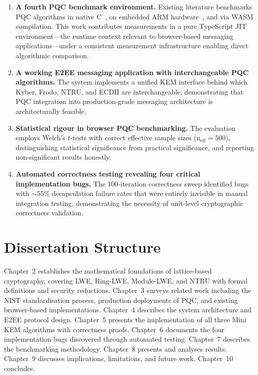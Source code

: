\documentclass[12pt,a4paper]{report}
\begin{document}
\begin{enumerate}
  \item \textbf{A fourth PQC benchmark environment.} Existing literature benchmarks
  PQC algorithms in native C~\cite{crystals_kyber_spec}, on embedded ARM
  hardware~\cite{pqm4}, and via WASM compilation. This work contributes measurements
  in a pure TypeScript JIT environment---the runtime context relevant to browser-based
  messaging applications---under a consistent measurement infrastructure enabling
  direct algorithmic comparison.

  \item \textbf{A working E2EE messaging application with interchangeable PQC
  algorithms.} The system implements a unified KEM interface behind which Kyber, Frodo,
  NTRU, and ECDH are interchangeable, demonstrating that PQC integration into
  production-grade messaging architecture is architecturally feasible.

  \item \textbf{Statistical rigour in browser PQC benchmarking.} The evaluation
  employs Welch's $t$-tests with correct effective sample sizes (n$_{\text{eff}}=500$),
  distinguishing statistical significance from practical significance, and reporting
  non-significant results honestly.

  \item \textbf{Automated correctness testing revealing four critical implementation
  bugs.} The 100-iteration correctness sweep identified bugs with ${\sim}55\%$
  decapsulation failure rates that were entirely invisible in manual integration
  testing, demonstrating the necessity of unit-level cryptographic correctness
  validation.
\end{enumerate}

\section{Dissertation Structure}

Chapter~2 establishes the mathematical foundations of lattice-based cryptography,
covering LWE, Ring-LWE, Module-LWE, and NTRU with formal definitions and security
reductions. Chapter~3 surveys related work including the NIST standardisation process,
production deployments of PQC, and existing browser-based implementations.
Chapter~4 describes the system architecture and E2EE protocol design. Chapter~5
presents the implementation of all three Mini KEM algorithms with correctness proofs.
Chapter~6 documents the four implementation bugs discovered through automated testing.
Chapter~7 describes the benchmarking methodology. Chapter~8 presents and analyses
results. Chapter~9 discusses implications, limitations, and future work.
Chapter~10 concludes.
\end{document}
